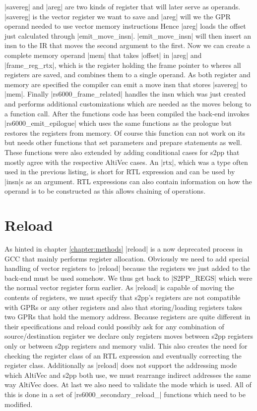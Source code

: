 |savereg| and |areg| are two kinds of register that will later serve as operands.
|savereg| is the vector register we want to save and |areg| will we the GPR operand needed to use vector memory instructions
Hence |areg| loads the offset just calculated through |emit_move_insn|.
|emit_move_insn| will then insert an insn to the IR that moves the second argument to the first.
Now we can create a complete memory operand |mem| that takes |offset| in |areg| and |frame_reg_rtx|, which is the register holding the frame pointer to wheres all registers are saved, and combines them to a single operand.
As both register and memory are specified the compiler can emit a move insn that stores |savereg| to |mem|.
Finally |rs6000_frame_related| handles the insn which was just created and performs additional customizations which are needed as the moves belong to a function call.
After the functions code has been compiled the back-end invokes |rs6000_emit_epilogue| which uses the same functions as the prologue but restores the registers from memory.
Of course this function can not work on its but needs other functions that set parameters and prepare statements as well.
These functions were also extended by adding conditional cases for s2pp that mostly agree with the respective AltiVec cases.
An |rtx|, which was a type often used in the previous listing, is short for RTL expression and can be used by |insn|s as an argument.
RTL expressions can also contain information on how the operand is to be constructed as this allows chaining of operations.

\section{Reload}
As hinted in chapter \ref{chapter:methods} |reload| is a now deprecated process in GCC that mainly performs register allocation.
Obviously we need to add special handling of vector registers to |reload| because the registers we just added to the back-end must be used somehow.
We thus get back to |S2PP_REGS| which were the normal vector register form earlier.
As |reload| is capable of moving the contents of registers, we must specify that s2pp's registers are not compatible with GPRs or any other registers and also that storing/loading registers takes two GPRs that hold the memory address.
Because registers are quite different in their specifications and reload could possibly ask for any combination of source/destination register we declare only registers moves between s2pp registers only or between s2pp registers and memory valid.
This also creates the need for checking the register class of an RTL expression and eventually correcting the register class.
Additionally as |reload| does not support the addressing mode which AltiVec and s2pp both use, we must rearrange indirect addresses the same way AltiVec does.
At last we also need to validate the mode which is used.
All of this is done in a set of  |rs6000_secondary_reload_| functions which need to be modified.

